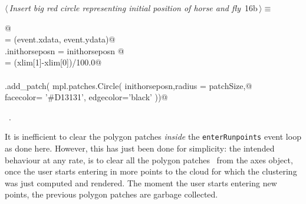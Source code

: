 \documentclass[11.5pt]{report}
\begin{document}
\vspace{-0.8cm} \newchunk
\begin{flushleft} \small
\begin{minipage}{\linewidth}\label{scrap9}\raggedright\small
{} $\langle\,${\itshape Insert big red circle representing initial position of horse and fly}\nobreak\ {\footnotesize {16b}}$\,\rangle\equiv$
\vspace{-1ex}
\begin{list}{}{} \item
\mbox{}\verb@ @\\
\mbox{}\verb@inithorseposn     = (event.xdata, event.ydata)@\\
\mbox{}\verb@run.inithorseposn = inithorseposn  @\\
\mbox{}\verb@patchSize         = (xlim[1]-xlim[0])/100.0@\\
\mbox{}\verb@@\\
\mbox{}\verb@ax.add_patch( mpl.patches.Circle( inithorseposn,radius = patchSize,@\\
\mbox{}\verb@                                  facecolor= '#D13131', edgecolor='black' ))@\\
\mbox{}\verb@@{\NWsep}
\end{list}
\vspace{-1.5ex}
\footnotesize
\begin{list}{}{\setlength{\itemsep}{-\parsep}\setlength{\itemindent}{-\leftmargin}}
\item \NWtxtMacroRefIn\ .

\item{}
\end{list}
\end{minipage}\vspace{4ex}
\end{flushleft}



\vspace{-0.8cm} \newchunk   
 It is inefficient to clear the polygon patches \textit{inside} the
 \verb|enterRunpoints| event loop as done here. However, this has just been done for 
 simplicity: the intended behaviour at any rate, is to clear all the polygon patches \
 from the axes object, once the user starts entering in more points to the cloud
 for which the clustering was just computed and rendered. The moment the user starts 
 entering new points, the previous polygon patches are garbage collected. 
\end{document}
